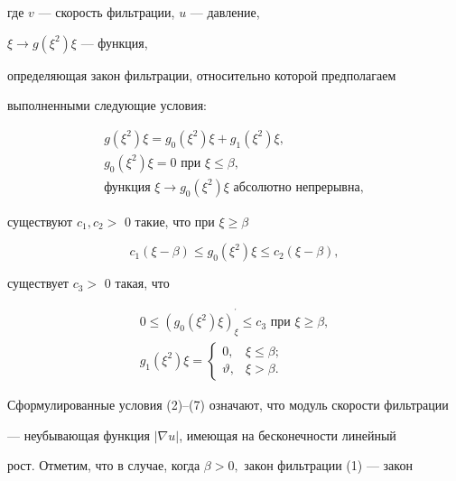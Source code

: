 где $v$ --- скорость фильтрации, $u$ --- давление, 


$\xi \to g(\xi^{2})\xi$ --- функция,


определяющая закон фильтрации, относительно которой предполагаем


выполненными следующие условия:


\begin{gather}


g(\xi^{2})\xi = g_{0}(\xi^{2})\xi + g_{1}(\xi^{2})\xi, \\


g_{0}(\xi^{2})\xi = 0 \text{ при } \xi \le \beta,\\


\text{функция }\xi \to g_{0}(\xi^{2})\xi\text{ абсолютно непрерывна},


\end{gather}


существуют $c_{1},c_{2} >$ 0 такие, что при $\xi \ge \beta $ 


\begin{equation}


c_{1}(\xi - \beta) \le g_{0}(\xi^{2})\xi \le c_{2} (\xi - \beta),


\end{equation}


существует $c_{3} >$ 0 такая, что 


\begin{gather}


0 \le (g_{0}(\xi^{2})\xi)^{^\prime }_{\xi } \le c_{3} \text{ при } 


\xi \ge \beta, \\


g_{1}(\xi^{2})\xi =


\begin{cases}


0, & \xi \le \beta; \\


\vartheta, & \xi > \beta.


\end{cases}


\end{gather}


 


Сформулированные условия (2)--(7) означают, что модуль скорости фильтрации 


--- неубывающая функция $|\nabla u|$, имеющая на бесконечности линейный 


рост. Отметим, что в случае, когда $\beta > 0,$ закон фильтрации (1) --- закон 


